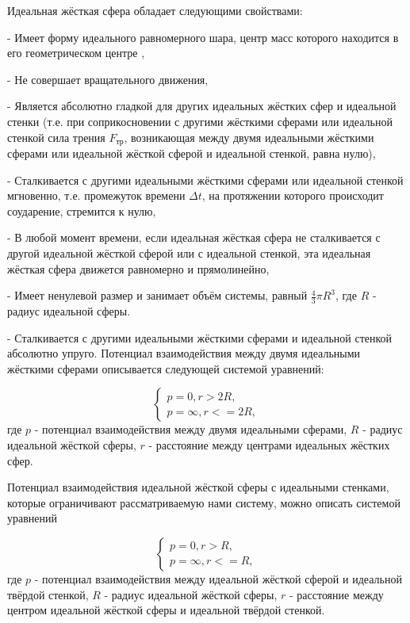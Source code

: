 \documentclass[a4paper]{article}
\begin{document}
Идеальная жёсткая сфера обладает следующими свойствами:

 - Имеет форму идеального равномерного шара, центр масс которого находится в его геометрическом центре \cite{Dzonkali_1989_Physics_T1},
     
 - Не совершает вращательного движения, 
 
 - Является абсолютно гладкой для других идеальных жёстких сфер и идеальной стенки (т.е. при соприкосновении с другими жёсткими сферами или идеальной стенкой сила трения $ F_{тр} $, возникающая между двумя идеальными жёсткими сферами или идеальной жёсткой сферой и идеальной стенкой, равна нулю),
 
 - Сталкивается с другими идеальными жёсткими сферами или идеальной стенкой мгновенно, т.е. промежуток времени $ \Delta t $, на протяжении которого происходит соударение, стремится к нулю,
 
 - В любой момент времени, если идеальная жёсткая сфера не сталкивается с другой идеальной жёсткой сферой или с идеальной стенкой, эта идеальная жёсткая сфера движется равномерно и прямолинейно, 
 
 - Имеет ненулевой размер и занимает объём системы, равный $ \frac{4}{3} \pi R^3 $, где $ R $ - радиус идеальной сферы. 
 
 - Сталкивается с другими идеальными жёсткими сферами и идеальной стенкой абсолютно упруго. Потенциал взаимодействия между двумя идеальными жёсткими сферами описывается следующей системой уравнений:

\begin{equation}\label{eq:rule_of_potential_between_two_particles}
    \begin{cases}
        p = 0, r > 2R,
        \\
        p = \infty, r <= 2R,
    \end{cases}
\end{equation}
где $ p $ - потенциал взаимодействия между двумя идеальными сферами, $ R $ - радиус идеальной жёсткой сферы, $ r $ - расстояние между центрами  идеальных жёстких сфер. 

Потенциал взаимодействия идеальной жёсткой сферы с идеальными стенками, которые ограничивают рассматриваемую нами систему, можно описать системой уравнений

\begin{equation}\label{eq:rule_of_potential_between_particles_and_walls}
    \begin{cases}
        p = 0, r > R,
        \\
        p = \infty, r <= R,
    \end{cases}
\end{equation}
где $ p $ - потенциал взаимодействия между идеальной жёсткой сферой и идеальной твёрдой стенкой, $ R $ - радиус идеальной жёсткой сферы, $ r $ - расстояние между центром идеальной жёсткой сферы и идеальной твёрдой стенкой.
\end{document}
